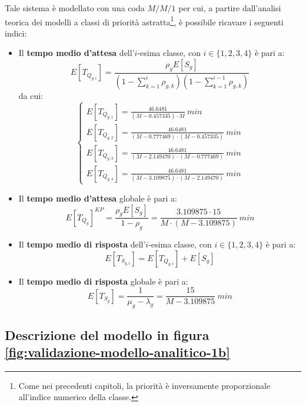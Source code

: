 Tale sistema è modellato con una coda $M/M/1$ per cui, a partire dall'analisi teorica dei modelli a classi di priorità astratta\footnote{\label{note:validazione-1}Come nei precedenti capitoli, la priorità è inversamente proporzionale all'indice numerico della classe.}, è possibile ricavare i seguenti indici:
\begin{itemize}
\item Il \textbf{tempo medio d'attesa} dell'$i$-esima classe, con $i\in\lbrace 1, 2, 3, 4\rbrace$ è pari a:
\begin{equation}
E[T_{Q_{g,i}}] = \frac{\rho_g E[S_g]}{\left(1- \sum_{k=1}^{i} \rho_{g,k}\right)\left(1- \sum_{k=1}^{i-1} \rho_{g,k}\right)}
\end{equation}
da cui:
\begin{equation}
\begin{cases}
E[T_{Q_{g,1}}] = \frac{46.6481}{(M-0.457335)\cdot M}\ min \\[1.5em]
E[T_{Q_{g,2}}] = \frac{46.6481}{(M-0.777469)\cdot(M-0.457335)}\ min \\[1em]
E[T_{Q_{g,3}}] = \frac{46.6481}{(M-2.149470)\cdot(M-0.777469)}\ min \\[1em]
E[T_{Q_{g,4}}] = \frac{46.6481}{(M-3.109875)\cdot(M-2.149470)}\ min
\end{cases}
\end{equation}
\item Il \textbf{tempo medio d'attesa} globale è pari a:
\begin{equation}
\label{eqn:validazione-11}
E[T_{Q_g}]^{KP} = \frac{\rho_g E[S_g]}{1-\rho_g} = \frac{3.109875\cdot 15}{M\cdot (M-3.109875)}\ min
\end{equation}
\item Il \textbf{tempo medio di risposta} dell'$i$-esima classe, con $i\in\lbrace 1, 2, 3, 4\rbrace$ è pari a:
\begin{equation}
E[T_{S_{g,i}}] = E[T_{Q_{g,i}}] + E[S_g]
\end{equation}
\item Il \textbf{tempo medio di risposta} globale è pari a:
\begin{equation}
\label{eqn:validazione-13}
E[T_{S_g}] = \frac{1}{\mu_g - \lambda_g} = \frac{15}{M-3.109875}\ min
\end{equation}
\end{itemize}

\subsection{Descrizione del modello in figura \ref{fig:validazione-modello-analitico-1b}}

